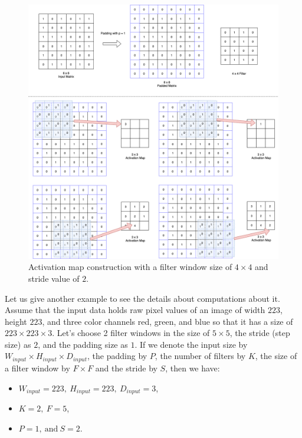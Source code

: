 \begin{figure}[!h]
	\centering
	\includegraphics[width=\linewidth]{fig/conv_layer.png}
	\vspace*{2mm}
	\caption{Activation map construction with a filter window size of  $4 \times 4$ and stride value of $2$.}
	\label{conv_layer}
\end{figure}

Let us give another example to see the details about computations about it. Assume that the input data 
holds raw pixel values of an image of width $223$, height $223$, and three color channels red, green, and blue so that it has a size of $223 \times 223 \times 3$. Let's choose 2 filter windows in the size of $5 \times 5$, the stride (step size) as $2$, and the padding size as $1$. If we denote the input size by $W_{input} \times H_{input} \times D_{input}$, the padding by $P$, the number of filters by $K$, the size of a filter window by $F \times F$ and the stride by $S$, then we have: 

\begin{itemize}
    \item $W_{input} = 223, \: H_{input} = 223, \: D_{input} = 3$,
    \item $K = 2, \: F = 5$,
    \item $P = 1, \: \text{and} \: S = 2$.
\end{itemize}

